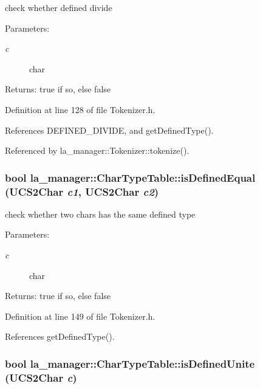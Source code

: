 check whether defined divide 

\begin{Desc}
\item[Parameters:]
\begin{description}
\item[{\em c}]char \end{description}
\end{Desc}
\begin{Desc}
\item[Returns:]true if so, else false \end{Desc}


Definition at line 128 of file Tokenizer.h.

References DEFINED\_\-DIVIDE, and getDefinedType().

Referenced by la\_\-manager::Tokenizer::tokenize().\hypertarget{classla__manager_1_1CharTypeTable_bcbf2007f841e5cbb37ff00e3fa8584a}{
\subsubsection[{isDefinedEqual}]{\setlength{\rightskip}{0pt plus 5cm}bool la\_\-manager::CharTypeTable::isDefinedEqual (UCS2Char {\em c1}, \/  UCS2Char {\em c2})}}
\label{classla__manager_1_1CharTypeTable_bcbf2007f841e5cbb37ff00e3fa8584a}


check whether two chars has the same defined type 

\begin{Desc}
\item[Parameters:]
\begin{description}
\item[{\em c}]char \end{description}
\end{Desc}
\begin{Desc}
\item[Returns:]true if so, else false \end{Desc}


Definition at line 149 of file Tokenizer.h.

References getDefinedType().\hypertarget{classla__manager_1_1CharTypeTable_e804d650ddf512317379b6b0bdca79e3}{
\subsubsection[{isDefinedUnite}]{\setlength{\rightskip}{0pt plus 5cm}bool la\_\-manager::CharTypeTable::isDefinedUnite (UCS2Char {\em c})}}
\label{classla__manager_1_1CharTypeTable_e804d650ddf512317379b6b0bdca79e3}


